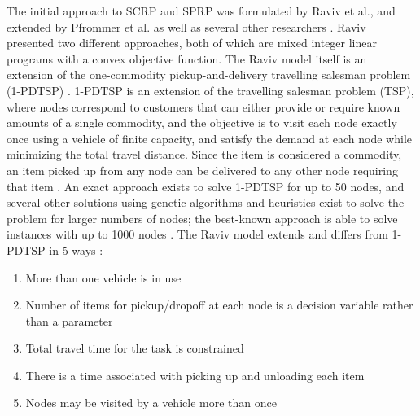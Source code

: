 \documentclass[conference]{IEEEtran}
\begin{document}
The initial approach to SCRP and SPRP was formulated by Raviv et al., and extended by Pfrommer et al. as well as several other researchers \cite{pal_zhang}\cite{raviv}\cite{pfrommer}. Raviv presented two different approaches, both of which are mixed integer linear programs with a convex objective function. The Raviv model itself is an extension of the one-commodity pickup-and-delivery travelling salesman problem (1-PDTSP) \cite{raviv}. 1-PDTSP is an extension of the travelling salesman problem (TSP), where nodes correspond to customers that can either provide or require known amounts of a single commodity, and the objective is to visit each node exactly once using a vehicle of finite capacity, and satisfy the demand at each node while minimizing the total travel distance. Since the item is considered a commodity, an item picked up from any node can be delivered to any other node requiring that item \cite{salazar}. An exact approach exists to solve 1-PDTSP for up to 50 nodes, and several other solutions using genetic algorithms and heuristics exist to solve the problem for larger numbers of nodes; the best-known approach is able to solve instances with up to 1000 nodes \cite{salazar2}. The Raviv model extends and differs from 1-PDTSP in 5 ways \cite{raviv}:

\begin{enumerate}
    \item More than one vehicle is in use
    \item Number of items for pickup/dropoff at each node is a decision variable rather than a parameter
    \item Total travel time for the task is constrained
    \item There is a time associated with picking up and unloading each item
    \item Nodes may be visited by a vehicle more than once
\end{enumerate}
\end{document}
